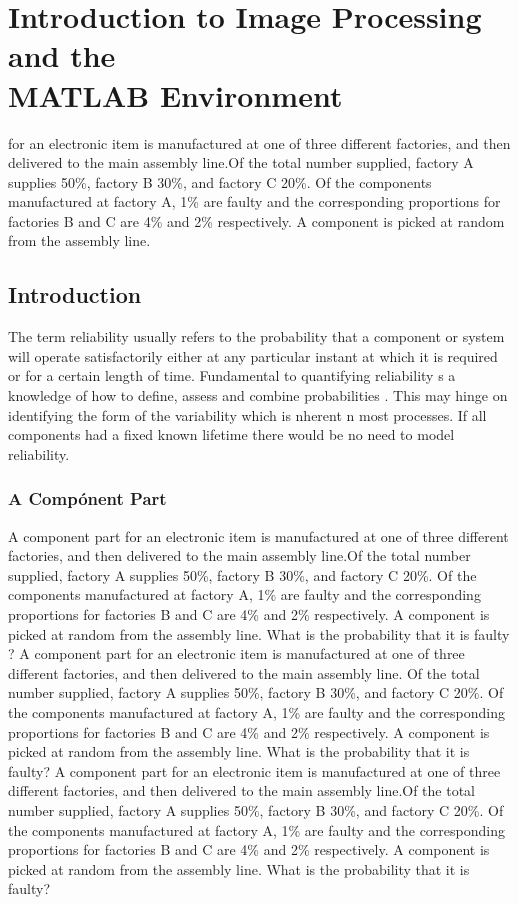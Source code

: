 

\chapter[Introduction to Image Processing and the MATLAB Environment]{Introduction to Image Processing and the\\ MATLAB Environment}


 for an electronic item is
manufactured at one of three different factories, and then delivered to
the main assembly line.Of the total number supplied, factory A supplies
50\%, factory B 30\%, and factory C 20\%. Of the components
manufactured at factory A, 1\% are faulty and the corresponding
proportions for factories B and C are 4\% and 2\% respectively. A
component is picked at random from the assembly line. 


\section{Introduction}\label{intro}
The term reliability usually refers to the probability that a
component or system will operate satisfactorily either at any particular
instant at which it is required or for a certain length of
time. Fundamental to quantifying reliability s a knowledge of how to
define, assess and combine probabilities \cite{Bontempi2005Adaptive}. This may hinge on identifying the
form of the variability which is nherent n most processes. If all
components had a fixed known lifetime there would be no need to model
reliability.


\subsection{A Comp\'onent Part}
A component part for an electronic item is
manufactured at one of three different factories, and then delivered to
the main assembly line.Of the total number supplied, factory A supplies
50\%, factory B 30\%, and factory C 20\%. Of the components
manufactured at factory A, 1\% are faulty and the corresponding
proportions for factories B and C are 4\% and 2\% respectively. A
component is picked at random from the assembly line. What is the
probability that it is faulty \cite{ilyas2004hsn}? 
A component part for an electronic item is
manufactured at one of three different factories, and then delivered to
the main assembly line. Of the total number supplied, factory A supplies
50\%, factory B 30\%, and factory C 20\%. Of the components
manufactured at factory A, 1\% are faulty and the corresponding
proportions for factories B and C are 4\% and 2\% respectively. A
component is picked at random from the assembly line. What is the
probability that it is faulty? 
A component part for an electronic item is
manufactured at one of three different factories, and then delivered to
the main assembly line.Of the total number supplied, factory A supplies
50\%, factory B 30\%, and factory C 20\%. Of the components
manufactured at factory A, 1\% are faulty and the corresponding
proportions for factories B and C are 4\% and 2\% respectively. A
component is picked at random from the assembly line. What is the
probability that it is faulty? 

